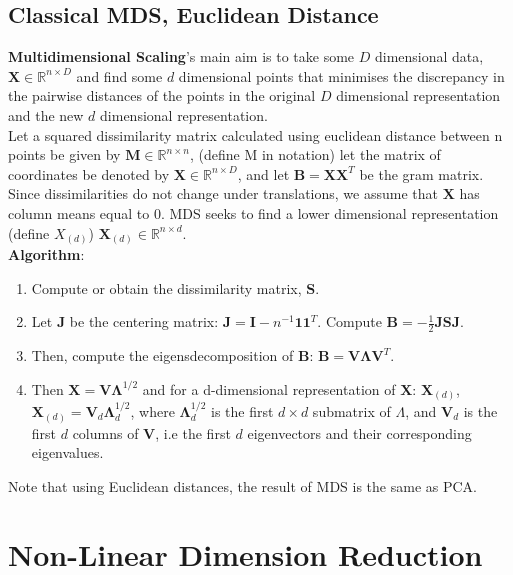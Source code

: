 \documentclass[12pt]{report}
\begin{document}
\subsection{Classical MDS, Euclidean Distance}
\textbf{Multidimensional Scaling}'s 
main aim is to take some $D$ dimensional data, $\mathbf{X} \in \mathbb{R}^{n \times D}$ 
and find some $d$ dimensional points that minimises the discrepancy 
in the pairwise distances of the points in the original $D$ dimensional
representation and the new $d$ dimensional representation.\\
Let a squared dissimilarity matrix calculated using euclidean distance
between n points be given by
$\mathbf{M} \in \mathbb{R}^{n \times n}$, (define M in notation)
let the matrix of coordinates be denoted by 
$\mathbf{X} \in \mathbb{R}^{n \times D}$, 
and let $\mathbf{B} = \mathbf{X}\mathbf{X}^T$ be the gram matrix.
Since dissimilarities do not change under translations, 
we assume that $\mathbf{X}$ has column means equal to 0. 
MDS seeks to find a lower dimensional representation (define $X_{(d)}$)
$\mathbf{X}_{(d)} \in \mathbb{R}^{n \times d}$.\\
\textbf{Algorithm}:
\begin{enumerate}
    \item Compute or obtain the dissimilarity matrix, $\mathbf{S}$.
    \item Let $\mathbf{J}$ be the centering matrix: 
    $\mathbf{J} = \mathbf{I} - n^{-1}\mathbf{1}\mathbf{1}^T$. 
    Compute $\mathbf{B} = -\frac{1}{2}\mathbf{J}\mathbf{S}\mathbf{J}$.
    \item Then, compute the eigensdecomposition of $\mathbf{B}$: 
    $\mathbf{B} = \mathbf{V}\mathbf{\Lambda}\mathbf{V}^T$. 
    \item Then $\mathbf{X} = \mathbf{V}\mathbf{\Lambda}^{1/2}$ 
    and for a d-dimensional representation of 
    $\mathbf{X}$: $\mathbf{X}_{(d)}$, $\mathbf{X}_{(d)} = \mathbf{V}_d\mathbf{\Lambda}^{1/2}_d$, 
    where $\mathbf{\Lambda}^{1/2}_d$ is the first $d \times d$ submatrix of $\Lambda$,
     and $\mathbf{V}_d$ is the first $d$ columns of $\mathbf{V}$, 
     i.e the first $d$ eigenvectors and their corresponding eigenvalues.
\end{enumerate}
Note that using Euclidean distances, the result of MDS is the same as PCA.

\section{Non-Linear Dimension Reduction}
\end{document}
